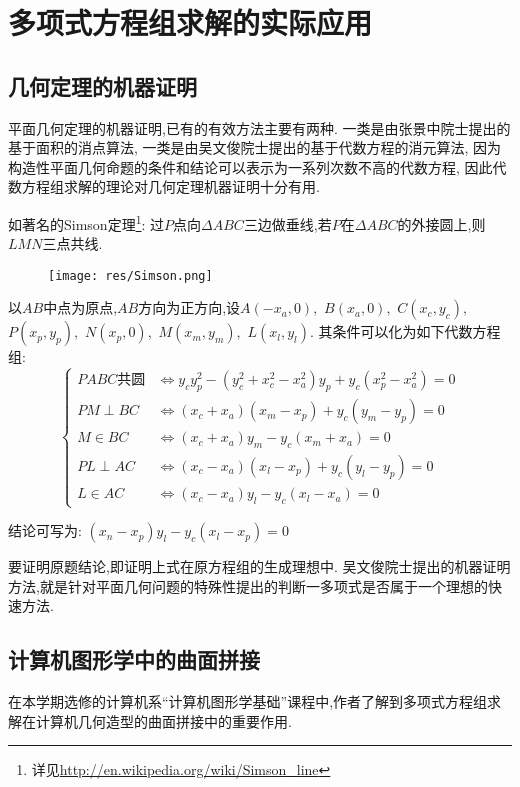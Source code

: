 \section{多项式方程组求解的实际应用}
\subsection{几何定理的机器证明}
	平面几何定理的机器证明,已有的有效方法主要有两种.
	一类是由张景中院士提出的基于面积的消点算法\cite{area_geo},
	一类是由吴文俊院士提出的基于代数方程的消元算法\cite{wwj},
	因为构造性平面几何命题的条件和结论可以表示为一系列次数不高的代数方程,
	因此代数方程组求解的理论对几何定理机器证明十分有用.
	
	如著名的Simson定理\footnote{详见\url{http://en.wikipedia.org/wiki/Simson_line}}:
	过$ P$点向$ \Delta ABC$三边做垂线,若$ P$在$ \Delta ABC$的外接圆上,则$  LMN$三点共线.
	\begin{figure}[h]
		\texttt{[image: res/Simson.png]}
	\end{figure}

	以$ AB$中点为原点,$AB$方向为正方向,设$ A(-x_a,0),$ $B(x_a,0),$ $C(x_c,y_c),$ $P(x_p,y_p),$ $N(x_p,0),$ $M(x_m,y_m),$ $L(x_l,y_l)$.
	其条件可以化为如下代数方程组:
	\[  \begin{cases}
		PABC\texttt{共圆} &\Leftrightarrow y_cy_p^2-(y_c^2+x_c^2-x_a^2)y_p+y_c(x_p^2-x_a^2) =0\\
		PM\perp BC &\Leftrightarrow (x_c+x_a)(x_m-x_p)+y_c(y_m-y_p) =0\\
		M \in BC &\Leftrightarrow (x_c + x_a)y_m - y_c(x_m+x_a) =0\\
		PL \perp AC &\Leftrightarrow (x_c-x_a)(x_l-x_p) + y_c(y_l-y_p) = 0\\
		L \in AC &\Leftrightarrow (x_c-x_a)y_l - y_c(x_l-x_a)  = 0
	\end{cases}\]

	结论可写为: 
	$ (x_n-x_p)y_l - y_c(x_l-x_p) = 0$

	要证明原题结论,即证明上式在原方程组的生成理想中.
	吴文俊院士提出的机器证明方法,就是针对平面几何问题的特殊性提出的判断一多项式是否属于一个理想的快速方法.

\subsection{计算机图形学中的曲面拼接}
	在本学期选修的计算机系``计算机图形学基础''课程中,作者了解到多项式方程组求解在计算机几何造型的曲面拼接中的重要作用.

